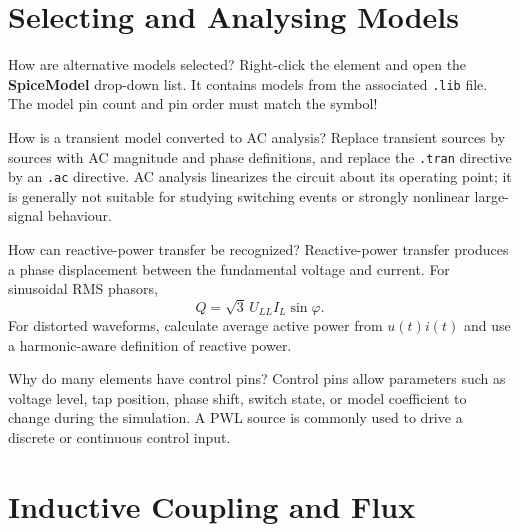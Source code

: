 \section{Selecting and Analysing Models}

\begin{formulaBox}{How are alternative models selected?}
Right-click the element and open the \textbf{SpiceModel} drop-down list. It
contains models from the associated \texttt{.lib} file. The model
pin count and pin order must match the symbol! 
\end{formulaBox}

\begin{formulaBox}{How is a transient model converted to AC analysis?}
Replace transient sources by sources with AC magnitude and phase definitions,
and replace the \texttt{.tran} directive by an \texttt{.ac} directive. AC
analysis linearizes the circuit about its operating point; it is generally not
suitable for studying switching events or strongly nonlinear large-signal
behaviour.
\end{formulaBox}

\begin{formulaBox}{How can reactive-power transfer be recognized?}
Reactive-power transfer produces a phase displacement between the fundamental
voltage and current. For sinusoidal RMS phasors,
\begin{equation}
Q=\sqrt{3}\,U_{LL}I_L\sin\varphi.
\end{equation}
For distorted waveforms, calculate average active power from $u(t)i(t)$ and
use a harmonic-aware definition of reactive power.
\end{formulaBox}

\begin{formulaBox}{Why do many elements have control pins?}
Control pins allow parameters such as voltage level, tap position, phase shift,
switch state, or model coefficient to change during the simulation. A PWL
source is commonly used to drive a discrete or continuous control input.
\end{formulaBox}

\section{Inductive Coupling and Flux}

